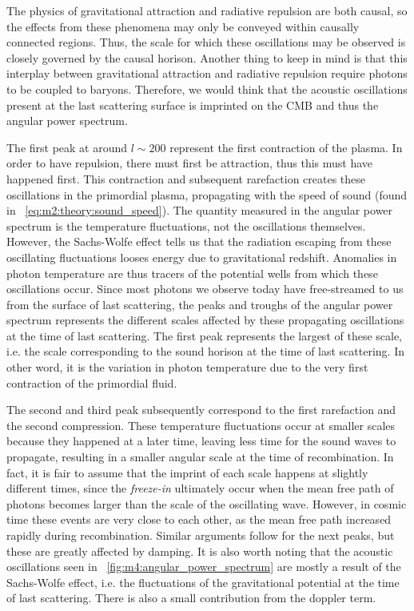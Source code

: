         The physics of gravitational attraction and radiative repulsion are both causal, so the effects from these phenomena may only be conveyed within causally connected regions. Thus, the scale for which these oscillations may be observed is closely governed by the causal horison. Another thing to keep in mind is that this interplay between gravitational attraction and radiative repulsion require photons to be coupled to baryons. Therefore, we would think that the acoustic oscillations present at the last scattering surface is imprinted on the CMB and thus the angular power spectrum.

        The first peak at around $l\sim200$ represent the first contraction of the plasma. In order to have repulsion, there must first be attraction, thus this must have happened first. This contraction and subsequent rarefaction creates these oscillations in the primordial plasma, propagating with the speed of sound (found in ~\cref{eq:m2:theory:sound_speed}). The quantity measured in the angular power spectrum is the temperature fluctuations, not the oscillations themselves. However, the Sachs-Wolfe effect tells us that the radiation escaping from these oscillating fluctuations looses energy due to gravitational redshift. Anomalies in photon temperature are thus tracers of the potential wells from which these oscillations occur. Since most photons we observe today have free-streamed to us from the surface of last scattering, the peaks and troughs of the angular power spectrum represents the different scales affected by these propagating oscillations at the time of last scattering. The first peak represents the largest of these scale, i.e. the scale corresponding to the sound horison at the time of last scattering. In other word, it is the variation in photon temperature due to the very first contraction of the primordial fluid. 

        The second and third peak subsequently correspond to the first rarefaction and the second compression. These temperature fluctuations occur at smaller scales because they happened at a later time, leaving less time for the sound waves to propagate, resulting in a smaller angular scale at the time of recombination. In fact, it is fair to assume that the imprint of each scale happens at slightly different times, since the \textit{freeze-in} ultimately occur when the mean free path of photons becomes larger than the scale of the oscillating wave. However, in cosmic time these events are very close to each other, as the mean free path increased rapidly during recombination. Similar arguments follow for the next peaks, but these are greatly affected by damping. It is also worth noting that the acoustic oscillations seen in ~\cref{fig:m4:angular_power_spectrum} are mostly a result of the Sachs-Wolfe effect, i.e. the fluctuations of the gravitational potential at the time of last scattering. There is also a small contribution from the doppler term.  

